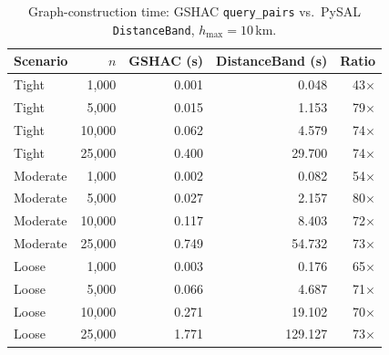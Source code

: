 \begin{table}[ht]
  \centering
  \caption{Graph-construction time: GSHAC \texttt{query\_pairs}
           vs.\ PySAL \texttt{DistanceBand}, \(h_{\max}=10\)\,km.}
  \label{tab:pysal}
  \small
  \begin{tabular}{lrrrr}
    \toprule
    Scenario & \(n\) & GSHAC (s) & DistanceBand (s) & Ratio \\
    \midrule
    Tight & 1{,}000 & 0.001 & 0.048 & 43$\times$ \\
    Tight & 5{,}000 & 0.015 & 1.153 & 79$\times$ \\
    Tight & 10{,}000 & 0.062 & 4.579 & 74$\times$ \\
    Tight & 25{,}000 & 0.400 & 29.700 & 74$\times$ \\
    \addlinespace
    Moderate & 1{,}000 & 0.002 & 0.082 & 54$\times$ \\
    Moderate & 5{,}000 & 0.027 & 2.157 & 80$\times$ \\
    Moderate & 10{,}000 & 0.117 & 8.403 & 72$\times$ \\
    Moderate & 25{,}000 & 0.749 & 54.732 & 73$\times$ \\
    \addlinespace
    Loose & 1{,}000 & 0.003 & 0.176 & 65$\times$ \\
    Loose & 5{,}000 & 0.066 & 4.687 & 71$\times$ \\
    Loose & 10{,}000 & 0.271 & 19.102 & 70$\times$ \\
    Loose & 25{,}000 & 1.771 & 129.127 & 73$\times$ \\
    \bottomrule
  \end{tabular}
\end{table}